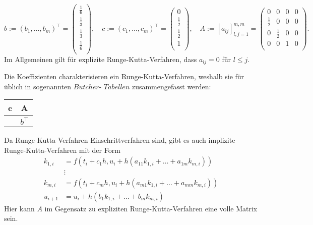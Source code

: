 \[
    b := \left( b_1, \dots , b_m \right)^{\intercal}
    =\left( \begin{matrix}
                \frac{1}{6}\\
                \frac{1}{3}\\
                \frac{1}{3}\\
                \frac{1}{6}\\
    \end{matrix}\right), \quad
    c := \left( c_1, \dots, c_m \right)^{\intercal}
    = \left( \begin{matrix}
                 0\\
                 \frac{1}{2}\\
                 \frac{1}{2}\\
                 1\\
    \end{matrix} \right), \quad
    A:=[a_{lj}]_{l,j=1}^{m,m} = \left( \begin{matrix}
                             0 & 0 & 0 & 0\\
                             \frac{1}{2} & 0 & 0 & 0 \\
                             0 & \frac{1}{2} & 0 & 0 \\
                             0 & 0 & 1 & 0\\
    \end{matrix} \right).
\]
Im Allgemeinen gilt für explizite Runge-Kutta-Verfahren, dass $a_{lj} = 0$ für $l \leq j$.\\
\begin{bem}
    Die Koeffizienten charakterisieren ein Runge-Kutta-Verfahren, weshalb sie für üblich in sogenannten
    $Butcher$- $Tabellen$ zusammengefasst werden:
    \begin{center}
        \begin{tabular}{c | c}
            c & A \\
            \hline
            & $b^{\intercal}$
        \end{tabular}
    \end{center}
\end{bem}
Da Runge-Kutta-Verfahren Einschrittverfahren sind, gibt es auch implizite Runge-Kutta-Verfahren mit der Form
\begin{align*}
    k_{1,i} &= f(t_i+c_1h, u_i + h(a_{11}k_{1,i} + \dots + a_{1m} k_{m,i})) \\
    &\vdots\\
    k_{m,i} &= f(t_i+c_mh, u_i + h(a_{m1}k_{1,i} + \dots + a_{mm} k_{m,i}))\\
    u_{i+1} &= u_i + h(b_1 k_{1,i} + \dots + b_m k_{m,i})
\end{align*}
Hier kann $A$ im Gegensatz zu expliziten Runge-Kutta-Verfahren eine volle Matrix sein.

